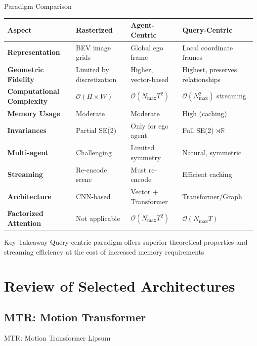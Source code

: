 \documentclass[10pt,aspectratio=169]{beamer}
\begin{document}
\begin{frame}{Paradigm Comparison}
\begin{table}[ht]
\centering
\footnotesize
\begin{tabular}{|p{2cm}|p{2.5cm}|p{2.5cm}|p{2.5cm}|}
\hline
\textbf{Aspect} & \textbf{Rasterized} & \textbf{Agent-Centric} & \textbf{Query-Centric} \\
\hline
\textbf{Representation} & BEV image grids & Global ego frame & Local coordinate frames \\
\hline
\textbf{Geometric Fidelity} & Limited by discretization & Higher, vector-based & Highest, preserves relationships \\
\hline
\textbf{Computational Complexity} & $\mathcal{O}(H \times W)$ & $\mathcal{O}(N_{\max}T^2)$ & $\mathcal{O}(N_{\max}^2)$ streaming \\
\hline
\textbf{Memory Usage} & Moderate & Moderate & High (caching) \\
\hline
\textbf{Invariances} & Partial SE(2) & Only for ego agent & Full SE(2) $\rtimes \mathbb{R}$ \\
\hline
\textbf{Multi-agent} & Challenging & Limited symmetry & Natural, symmetric \\
\hline
\textbf{Streaming} & Re-encode scene & Must re-encode & Efficient caching \\
\hline
\textbf{Architecture} & CNN-based & Vector + Transformer & Transformer/Graph \\
\hline
\textbf{Factorized Attention} & Not applicable & $\mathcal{O}(N_{\max}T^2)$ & $\mathcal{O}(N_{\max}T)$ \\
\hline
\end{tabular}
\end{table}

\begin{block}{Key Takeaway}
Query-centric paradigm offers superior theoretical properties and streaming efficiency at the cost of increased memory requirements
\end{block}
\end{frame}


\section{Review of Selected Architectures}

\subsection{MTR: Motion Transformer}
\begin{frame}{MTR: Motion Transformer}
    Lipsum
\end{frame}
\end{document}

